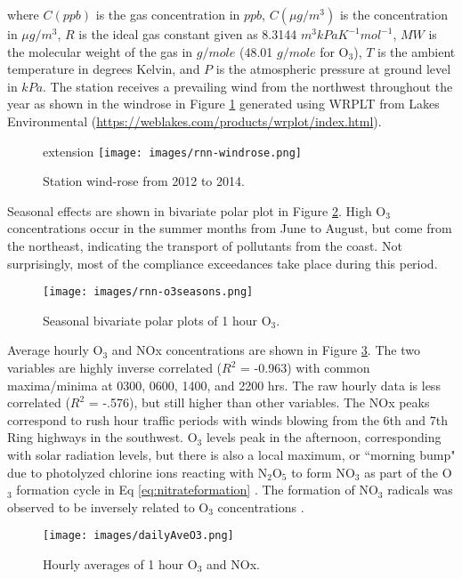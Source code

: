\noindent
where $C(ppb)$ is the gas concentration in $ppb$, $C(\mu g/m^{3})$ is the concentration in $\mu g/m^{3}$, $R$ is the ideal gas constant given as 8.3144 $m^{3}kPa K^{-1}mol^{-1}$, $MW$  is the molecular weight of the gas in $g/mole$ (48.01 $g/mole$ for O$_{3}$), $T$ is the ambient temperature in degrees Kelvin, and $P$ is the atmospheric pressure at ground level in $kPa$. The station receives a prevailing wind from the northwest throughout the year as shown in the windrose in Figure \ref{fig:windrose} generated using WRPLT from Lakes Environmental (\url{https://weblakes.com/products/wrplot/index.html}).
%
\begin{figure}[H]
\centering
 extension
\texttt{[image: images/rnn-windrose.png]} 
\caption{Station wind-rose from 2012 to 2014.}
\label{fig:windrose}
\end{figure}
%
Seasonal effects are shown in bivariate polar plot in Figure \ref{fig:bipolarplots}. High O$_{3}$ concentrations occur in the summer months from June to August, but come from the northeast, indicating the transport of pollutants from the coast. Not surprisingly, most of the compliance exceedances take place during this period.
%
\begin{figure}[H]
\centering
\texttt{[image: images/rnn-o3seasons.png]} 
\caption{Seasonal bivariate polar plots of 1 hour O$_3$.}
\label{fig:bipolarplots}
\end{figure}
%
Average hourly O$_{3}$ and NOx concentrations are shown in Figure \ref{fig:hourlyAveO3}. The two variables are highly inverse correlated ($R^{2}$ = -0.963) with common maxima/minima at 0300, 0600, 1400, and 2200 hrs. The raw hourly data is less correlated ($R^{2}$ = -.576), but still higher than other variables. The NOx peaks correspond to rush hour traffic periods with winds blowing from the 6th and 7th Ring highways in the southwest. O$_{3}$ levels peak in the afternoon, corresponding with solar radiation levels, but there is also a local maximum, or ``morning bump" due to photolyzed chlorine ions reacting with N$_{2}$O$_{5}$ to form NO$_{3}$ as part of the O$_{3}$ formation cycle in Eq \ref{eq:nitrateformation} \citep{Calvert2015}. The formation of NO$_{3}$ radicals was observed to be inversely related to O$_{3}$ concentrations \citep{Song2011}.
%
\begin{figure}[H]
\centering
\texttt{[image: images/dailyAveO3.png]}
\caption{Hourly averages of 1 hour O$_{3}$ and NOx.}
\label{fig:hourlyAveO3}
\end{figure}
%

